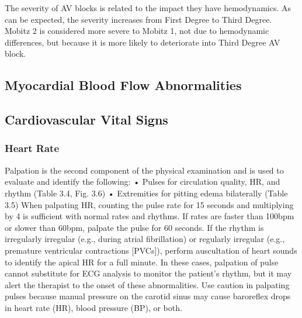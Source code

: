 
The severity of AV blocks is related to the impact they have hemodynamics. As can be expected, the severity increases from First Degree to Third Degree. Mobitz 2 is considered more severe to Mobitz 1, not due to hemodynamic differences, but because it is more likely to deteriorate into Third Degree AV block.

\subsection{Myocardial Blood Flow Abnormalities}

\subsection{Cardiovascular Vital Signs}

\subsubsection{Heart Rate} 
Palpation is the second component of the physical examination and is used to evaluate and identify the following:
•	Pulses for circulation quality, HR, and rhythm (Table 3.4, Fig. 3.6)
•	Extremities for pitting edema bilaterally (Table 3.5)
When palpating HR, counting the pulse rate for 15 seconds and multiplying by 4 is sufficient with normal rates and rhythms. If rates are faster than 100bpm or slower than 60bpm, palpate the pulse for 60 seconds. If the rhythm is irregularly irregular (e.g., during atrial fibrillation) or regularly irregular (e.g., premature ventricular contractions [PVCs]), perform auscultation of heart sounds to identify the apical HR for a full minute. In these cases, palpation of pulse cannot substitute for ECG analysis to monitor the patient’s rhythm, but it may alert the therapist to the onset of these abnormalities.
Use caution in palpating pulses because manual pressure on the carotid sinus may cause baroreflex drops in heart rate (HR), blood pressure (BP), or both.


